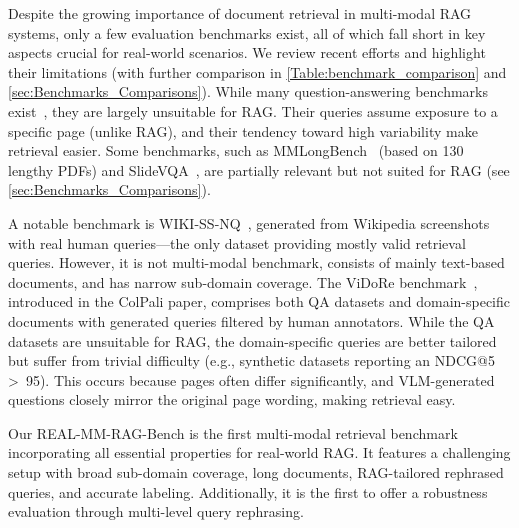 Despite the growing importance of document retrieval in multi-modal RAG systems, only a few evaluation benchmarks exist, all of which fall short in key aspects crucial for real-world scenarios. We review recent efforts and highlight their limitations (with further comparison in \cref{Table:benchmark_comparison} and \cref{sec:Benchmarks_Comparisons}).
While many question-answering benchmarks exist~\citep{mathew2021docvqa,zhu2022towards,masry2022chartqa,islam2023financebench,ding2024mvqa}, they are largely unsuitable for RAG. Their queries assume exposure to a specific page (unlike RAG), and their tendency toward high variability make retrieval easier. Some benchmarks, such as MMLongBench~\citep{ma2024mmlongbench} (based on 130 lengthy PDFs) and SlideVQA~\citep{tanaka2023slidevqa}, are partially relevant but not suited for RAG (see \cref{sec:Benchmarks_Comparisons}).

\vspace{0.1cm}
\noindent
A notable benchmark is WIKI-SS-NQ~\citep{ma2024unifying}, generated from Wikipedia screenshots with real human queries—the only dataset providing mostly valid retrieval queries. However, it is not multi-modal benchmark, consists of mainly text-based documents, and has narrow sub-domain coverage.
The ViDoRe benchmark~\citep{faysse2024colpali}, introduced in the ColPali paper, comprises both QA datasets and domain-specific documents with generated queries filtered by human annotators. While the QA datasets are unsuitable for RAG, the domain-specific queries are better tailored but suffer from trivial difficulty (e.g., synthetic datasets reporting an NDCG@5 >~95). This occurs because pages often differ significantly, and VLM-generated questions closely mirror the original page wording, making retrieval easy.

\vspace{0.1cm}
\noindent
Our REAL-MM-RAG-Bench is the first multi-modal retrieval benchmark incorporating all essential properties for real-world RAG. It features a challenging setup with broad sub-domain coverage, long documents, RAG-tailored rephrased queries, and accurate labeling. Additionally, it is the first to offer a robustness evaluation through multi-level query rephrasing.




